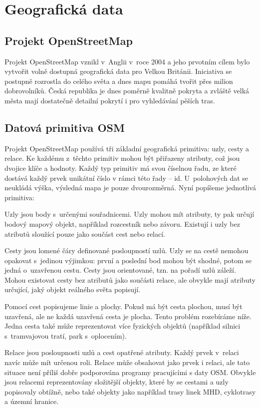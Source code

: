 \chapter{Geografická data}
\section{Projekt OpenStreetMap}
Projekt OpenStreetMap \cite{osmweb} vznikl v~Anglii v~roce 2004 a jeho prvotním cílem bylo
vytvořit volně dostupná geografická data pro Velkou Británii. Iniciativa se
postupně rozrostla do celého světa a dnes mapu pomáhá tvořit přes milion
dobrovolníků. Česká republika je dnes poměrně kvalitně pokryta a zvláště velká
města mají dostatečně detailní pokrytí i pro vyhledávání pěších tras.

\section{Datová primitiva OSM} 
Projekt OpenStreetMap používá tři základní geografická primitiva: uzly, cesty a
relace. Ke každému z~těchto primitiv mohou být přiřazeny atributy, což jsou
dvojice klíče a hodnoty. Každý typ primitiv má svou číselnou řadu, ze které
dostává každý prvek unikátní číslo v rámci této řady -- id. 
U~polohových dat se neukládá výška, výsledná mapa je pouze dvourozměrná.
Nyní popíšeme jednotlivá primitiva:

{\tuc Uzly} jsou body s~určenými souřadnicemi. Uzly mohou mít atributy, ty pak
určují bodový mapový objekt, například rozcestník nebo závoru. Existují i uzly
bez atributů sloužící pouze jako součást cest nebo relací.

{\tuc Cesty} jsou lomené čáry definované posloupností uzlů. Uzly se na cestě nemohou opakovat
s~jedinou výjimkou: první a poslední bod mohou být shodné, potom se jedná
o~uzavřenou cestu. Cesty jsou orientované, tzn. na pořadí uzlů záleží. Mohou
existovat cesty bez atributů jako součásti relace, ale obvykle mají atributy
určující, jaký objekt reálného světa popisují.

Pomocí cest popisujeme linie a plochy. Pokud má být cesta plochou, musí být
uzavřená, ale ne každá uzavřená cesta je plocha. Tento problém rozebíráme níže.
Jedna cesta také může reprezentovat více fyzických objektů (například silnici
s~tramvajovou tratí, park s~oplocením).

{\tuc Relace} jsou posloupnosti uzlů a cest opatřené atributy. Každý prvek
v~relaci navíc může mít určenou roli. Relace může obsahovat jako prvek i relaci,
ale tato situace není příliš dobře podporována programy pracujícími s daty OSM. 
Obvykle jsou relacemi reprezentovány složitější objekty, které by se cestami a
uzly popisovaly obtížně, nebo také  objekty jako například
trasy linek MHD, cyklotrasy a územní hranice.

